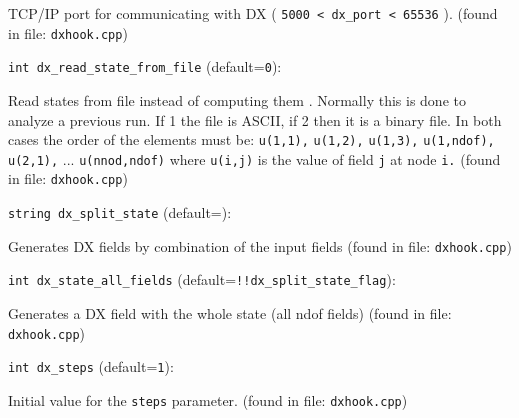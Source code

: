TCP/IP port for communicating with DX ( \verb+5000 < dx_port < 65536+ ). 
 (found in file: \verb+dxhook.cpp+)
\item\verb+int dx_read_state_from_file+ {\rm(default=\verb|0|)}:

Read states from file instead of computing them . Normally
 this is done to analyze a previous run. If 1 the file is
 ASCII, if 2 then it is a binary file. In both cases the order
 of the elements must be: \verb+u(1,1),+ \verb+u(1,2),+ \verb+u(1,3),+
 \verb+u(1,ndof),+ \verb+u(2,1),+ ... \verb+u(nnod,ndof)+ where \verb+u(i,j)+ is
 the value of field \verb+j+ at node \verb+i.+ 
 (found in file: \verb+dxhook.cpp+)
\item\verb+string dx_split_state+ {\rm(default=\verb||)}:

Generates DX fields by combination of the input fields
 (found in file: \verb+dxhook.cpp+)
\item\verb+int dx_state_all_fields+ {\rm(default=\verb|!!dx_split_state_flag|)}:

Generates a DX field with the whole state (all ndof fields)
 (found in file: \verb+dxhook.cpp+)
\item\verb+int dx_steps+ {\rm(default=\verb|1|)}:

Initial value for the \verb+steps+ parameter. 
 (found in file: \verb+dxhook.cpp+)
